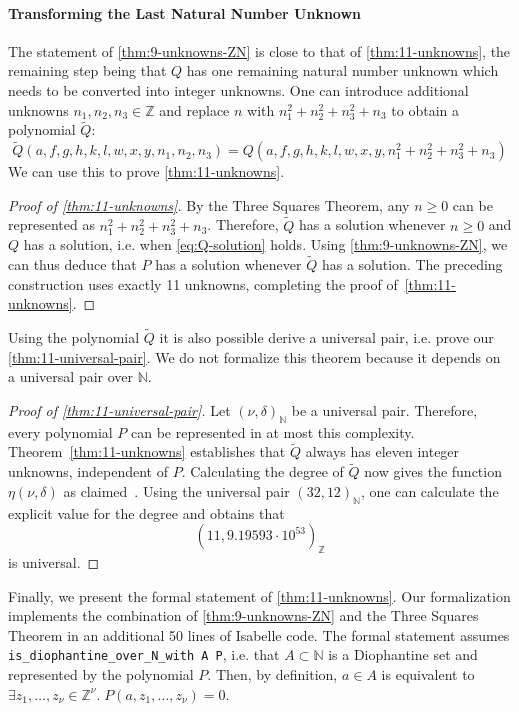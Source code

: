 \documentclass[a4paper,USenglish,cleveref,autoref,thm-restate]{lipics-v2021}
\newcommand{\N}{{\mathbb N}}
\newcommand{\Z}{{\mathbb Z}}
\begin{document}
\paragraph*{Transforming the Last Natural Number Unknown}
The statement of \cref{thm:9-unknowns-ZN} is close to that of \cref{thm:11-unknowns}, the remaining step being that $Q$ has one remaining natural number unknown which needs to be converted into integer unknowns. One can introduce additional unknowns $n_1, n_2, n_3 \in \Z$ and replace $n$ with $n_1^2 + n_2^2 + n_3^2 + n_3$ to obtain a polynomial $\tilde Q$:
\[ \tilde Q (a, f, g, h, k, l, w, x, y, n_1, n_2, n_3) = Q(a, f, g, h, k, l, w, x, y, n_1^2 + n_2^2 + n_3^2 + n_3) \]
We can use this to prove \cref{thm:11-unknowns}.
\begin{proof}[Proof of \cref{thm:11-unknowns}]
    By the Three Squares Theorem, any $n \geq 0$ can be represented as $n_1^2 + n_2^2 + n_3^2 + n_3$. Therefore, $\tilde Q$ has a solution whenever $n \geq 0$ and $Q$ has a solution, i.e. when \eqref{eq:Q-solution} holds. Using \cref{thm:9-unknowns-ZN}, we can thus deduce that $P$ has a solution whenever $\tilde Q$ has a solution. The preceding construction uses exactly 11 unknowns, completing the proof of~\cref{thm:11-unknowns}.
\end{proof}

Using the polynomial $\tilde Q$ it is also possible derive a universal pair, i.e. prove our \cref{thm:11-universal-pair}. We do not formalize this theorem because it depends on a universal pair over $\N$.
\begin{proof}[Proof of \cref{thm:11-universal-pair}]
    Let $(\nu, \delta)_\N$ be a universal pair. Therefore, every polynomial $P$ can be represented in at most this complexity. Theorem~\ref{thm:11-unknowns} establishes that $\tilde Q$ always has eleven integer unknowns, independent of $P$. Calculating the degree of $\tilde Q$ now gives the function $\eta(\nu, \delta)$ as claimed~\cite[Appendix A]{manuscript}. Using the universal pair $(32, 12)_\N$, one can calculate the explicit value for the degree and obtains that 
    \[ (11, 9.19593 \cdot 10^{53})_\Z \]
    is universal. 
\end{proof}

Finally, we present the formal statement of \cref{thm:11-unknowns}. Our formalization implements the combination of \cref{thm:9-unknowns-ZN} and the Three Squares Theorem in an additional 50 lines of Isabelle code. The formal statement assumes \lstinline{is_diophantine_over_N_with A P}, i.e. that $A \subset \N$ is a Diophantine set and represented by the polynomial $P$. Then, by definition, $a \in A$ is equivalent to $\exists z_1, \ldots, z_\nu \in \Z^\nu. \; P(a, z_1, \ldots, z_\nu) = 0$.
\end{document}
